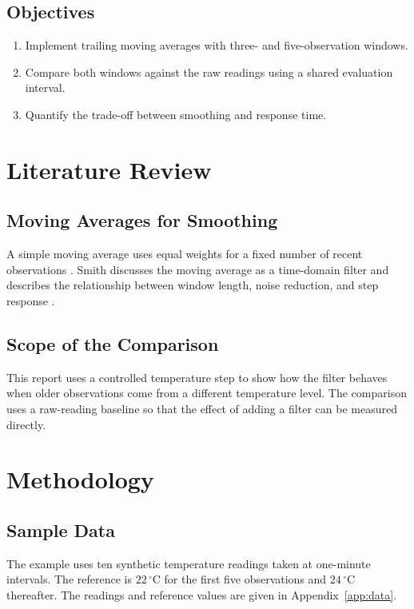 \documentclass[12pt,a4paper]{report}
\begin{document}
\section{Objectives}

\begin{enumerate}
  \item Implement trailing moving averages with three- and five-observation windows.
  \item Compare both windows against the raw readings using a shared evaluation interval.
  \item Quantify the trade-off between smoothing and response time.
\end{enumerate}

\chapter{Literature Review}

\section{Moving Averages for Smoothing}

A simple moving average uses equal weights for a fixed number of recent
observations \cite{nistMovingAverage}. Smith discusses the moving
average as a time-domain filter and describes the relationship between
window length, noise reduction, and step response \cite{smith1997dsp}.

\section{Scope of the Comparison}

This report uses a controlled temperature step to show how the filter
behaves when older observations come from a different temperature
level. The comparison uses a raw-reading baseline so that the effect
of adding a filter can be measured directly.

\chapter{Methodology}

\section{Sample Data}

The example uses ten synthetic temperature readings taken at one-minute
intervals. The reference is \(22\,^{\circ}\mathrm{C}\) for the first five
observations and \(24\,^{\circ}\mathrm{C}\) thereafter. The readings and
reference values are given in Appendix~\ref{app:data}.
\end{document}
